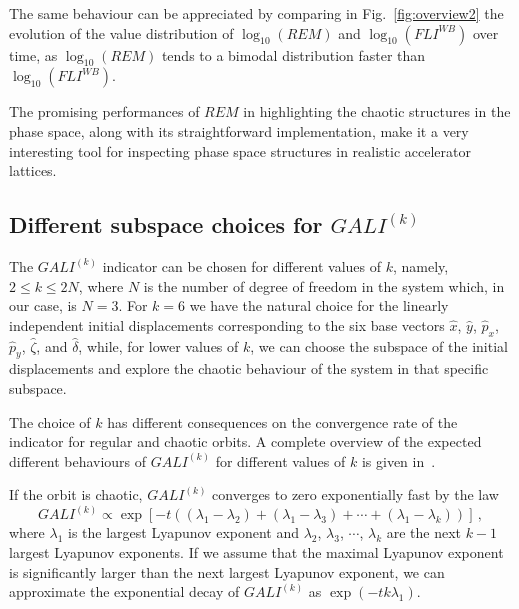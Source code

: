 The same behaviour can be appreciated by comparing in Fig.~\ref{fig:overview2} the evolution of the value distribution of $\log_{10}(REM)$ and $\log_{10}(FLI^{WB})$ over time, as $\log_{10}(REM)$ tends to a bimodal distribution faster than $\log_{10}(FLI^{WB})$.

The promising performances of $REM$ in highlighting the chaotic structures in the phase space, along with its straightforward implementation, make it a very interesting tool for inspecting phase space structures in realistic accelerator lattices.

\subsection{Different subspace choices for $GALI^{(k)}$}

The $GALI^{(k)}$ indicator can be chosen for different values of $k$, namely, $2 \leq k \leq 2N$, where $N$ is the number of degree of freedom in the system which, in our case, is $N=3$. For $k=6$ we have the natural choice for the linearly independent initial displacements corresponding to the six base vectors $\hat{x}$, $\hat{y}$, $\hat{p}_x$, $\hat{p}_y$, $\hat{\zeta}$, and $\hat{\delta}$, while, for lower values of $k$, we can choose the subspace of the initial displacements and explore the chaotic behaviour of the system in that specific subspace.

The choice of $k$ has different consequences on the convergence rate of the indicator for regular and chaotic orbits. A complete overview of the expected different behaviours of $GALI^{(k)}$ for different values of $k$ is given in~\cite{SKOKOS200730}.

If the orbit is chaotic, $GALI^{(k)}$ converges to zero exponentially fast by the law
\begin{equation}
    GALI^{(k)} \propto \exp\left[-t\left((\lambda_1 - \lambda_2)+(\lambda_1 - \lambda_3)+\cdots+(\lambda_1 - \lambda_k)\right)\right] \,,
\end{equation}
where $\lambda_1$ is the largest Lyapunov exponent and $\lambda_2$, $\lambda_3$, $\cdots$, $\lambda_k$ are the next $k-1$ largest Lyapunov exponents. If we assume that the maximal Lyapunov exponent is significantly larger than the next largest Lyapunov exponent, we can approximate the exponential decay of $GALI^{(k)}$ as $\exp(-tk\lambda_1)$.

